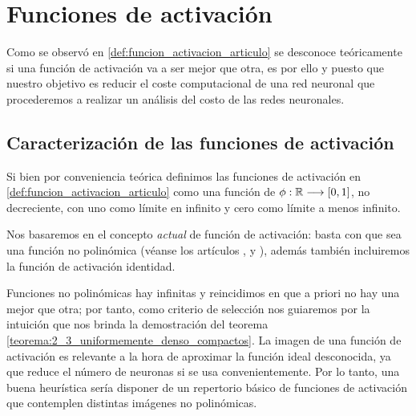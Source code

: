 
\chapter{Funciones de activación}
\label{funciones-activacion-democraticas-mas-demoscraticas}
Como se observó en 
\ref{def:funcion_activacion_articulo}
se desconoce teóricamente si una función de activación va a ser 
mejor que otra, es por ello y puesto que nuestro objetivo 
es reducir el coste computacional de una red neuronal
que procederemos a realizar un análisis del costo de las redes neuronales. 


\section{Caracterización de las funciones de activación}  

Si bien por conveniencia teórica definimos las funciones de activación en \ref{def:funcion_activacion_articulo}
como una función de $\phi:\mathbb{R} \longrightarrow [0,1]$, no 
decreciente, con uno como límite en infinito y cero como límite a 
menos infinito. 

\setlength{\marginparwidth}{\bigMarginSize}
Nos basaremos en el concepto \textit{actual} de función de activación:
basta con que sea una función no polinómica
(véanse  los artículos \cite{DBLP:journals/corr/SonodaM15}, \cite{modern-trainable-activation-functions} y \cite{FUNAHASHI1989183}),
además también incluiremos la función de activación identidad.

Funciones no polinómicas hay infinitas y reincidimos en que a priori no hay una mejor que otra; por tanto, como criterio de selección nos guiaremos por la intuición que nos brinda la demostración del teorema \ref{teorema:2_3_uniformemente_denso_compactos}.
  La imagen de una función de activación es relevante a la hora de aproximar la función ideal desconocida, ya que reduce el número 
  de neuronas si se usa convenientemente.  
Por lo tanto, una buena heurística sería disponer de un repertorio básico de funciones de activación que contemplen distintas imágenes no polinómicas. 

